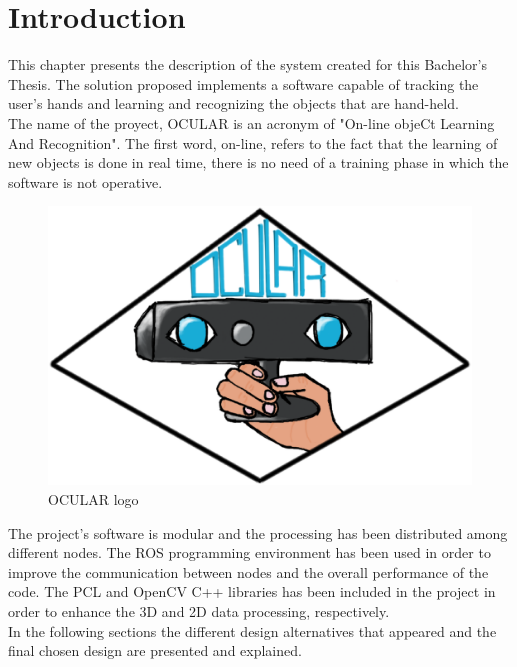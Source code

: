 \section{Introduction}

This chapter presents the description of the system created for this Bachelor's Thesis. The solution proposed implements a software capable of tracking the user's hands and learning and recognizing the objects that are hand-held. 
\\

The name of the proyect, OCULAR is an acronym of "On-line objeCt Learning And Recognition". The first word, on-line, refers to the fact that the learning of new objects is done in real time, there is no need of a training phase in which the software is not operative. 
\\

\begin{figure}[h]
	\begin{center}
\includegraphics[scale=0.3]{img/ocular_logo.eps}
	\caption[OCULAR Logo]{OCULAR logo}
	\end{center}
\end{figure}

The project's software is modular and the processing has been distributed among different nodes. The ROS programming environment has been used in order to improve the communication between nodes and the overall performance of the code. The PCL and OpenCV C++ libraries has been included in the project in order to enhance the 3D and 2D data processing, respectively. 
\\

In the following sections the different design alternatives that appeared and the final chosen design are presented and explained.
